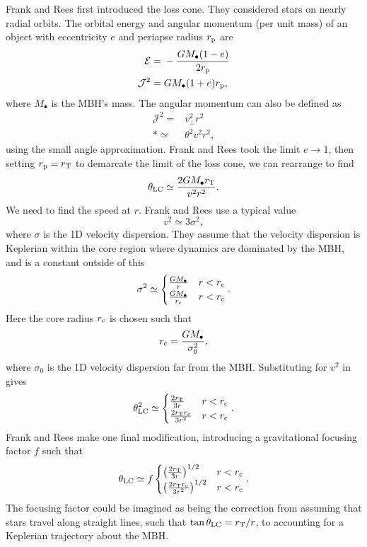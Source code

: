 Frank and Rees first introduced the loss cone. They considered stars on nearly radial orbits. The orbital energy and angular momentum (per unit mass) of an object with eccentricity $e$ and periapse radius $r_\mathrm{p}$ are
\begin{align}
\mathcal{E} = {} & -\frac{GM_\bullet(1 - e)}{2r_\mathrm{p}} \\
\mathcal{J}^2 = {} & GM_\bullet(1 + e)r_\mathrm{p},
\end{align}
where $M_\bullet$ is the MBH's mass. The angular momentum can also be defined as
\begin{align}
\mathcal{J}^2 = {} & v_\perp^2r^2 \nonumber \\*
 \simeq {} & \theta^2v^2r^2,
\end{align}
using the small angle approximation. Frank and Rees took the limit $e \rightarrow 1$, then setting $r_\mathrm{p} = r_\mathrm{T}$ to demarcate the limit of the loss cone, we can rearrange to find
\begin{equation}
\theta_\mathrm{LC} \simeq \frac{2GM_\bullet r_\mathrm{T}}{v^2r^2}.
\label{eq:LC-FR}
\end{equation}
We need to find the speed at $r$. Frank and Rees use a typical value
\begin{equation}
v^2 \simeq 3\sigma^2,
\end{equation}
where $\sigma$ is the 1D velocity dispersion. They assume that the velocity dispersion is Keplerian within the core region where dynamics are dominated by the MBH, and is a constant outside of this
\begin{equation}
\sigma^2 \simeq \begin{cases}
\frac{GM_\bullet}{r} & r < r_\mathrm{c} \\
\frac{GM_\bullet}{r_\mathrm{c}} & r < r_\mathrm{c}
\end{cases}.
\end{equation}
Here the core radius $r_\mathrm{c}$ is chosen such that
\begin{equation}
r_\mathrm{c} = \frac{GM_\bullet}{\sigma_0^2},
\end{equation}
where $\sigma_0$ is the 1D velocity dispersion far from the MBH. Substituting for $v^2$ in  gives
\begin{align}
\theta_\mathrm{LC}^2 \simeq \begin{cases}
\frac{2r_\mathrm{T}}{3r} & r < r_\mathrm{c} \\
\frac{2r_\mathrm{T}r_\mathrm{c}}{3r^2} & r < r_\mathrm{c}
\end{cases}.
\end{align}
Frank and Rees make one final modification, introducing a gravitational focusing factor $f$ such that
\begin{align}
\theta_\mathrm{LC} \simeq f\begin{cases}
\left(\frac{2r_\mathrm{T}}{3r}\right)^{1/2} & r < r_\mathrm{c} \\
\left(\frac{2r_\mathrm{T}r_\mathrm{c}}{3r^2}\right)^{1/2} & r < r_\mathrm{c}
\end{cases}.
\end{align}
The focusing factor could be imagined as being the correction from assuming that stars travel along straight lines, such that $\tan\theta_\mathrm{LC} = r_\mathrm{T}/r$, to accounting for a Keplerian trajectory about the MBH.

